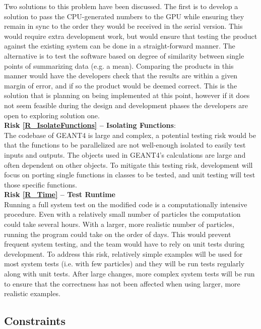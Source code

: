 \documentclass[12pt]{article}
\begin{document}
Two solutions to this problem have been discussed. The first is to develop a solution to pass the CPU-generated numbers to the GPU while ensuring they remain in sync to the order they would be received in the serial version. This would require extra development work, but would ensure that testing the product against the existing system can be done in a straight-forward manner. The alternative is to test the software based on degree of similarity between single points of summarizing data (e.g. a mean). Comparing the products in this manner would have the developers check that the results are within a given margin of error, and if so the product would be deemed correct. This is the solution that is planning on being implemented at this point, however if it does not seem feasible during the design and development phases the developers are open to exploring solution one.\\

\textbf{Risk \ref{R_IsolateFunctions} -- Isolating Functions}:\\
The codebase of GEANT4 is large and complex, a potential testing risk would be that the functions to be parallelized are not well-enough isolated to easily test inputs and outputs. The objects used in GEANT4's calculations are large and often dependent on other objects. To mitigate this testing risk, development will focus on porting single functions in classes to be tested, and unit testing will test those specific functions.\\

\textbf{Risk \ref{R_Time} -- Test Runtime}\\
Running a full system test on the modified code is a computationally intensive procedure. Even with a relatively small number of particles the computation could take several hours. With a larger, more realistic number of particles, running the program could take on the order of days. This would prevent frequent system testing, and the team would have to rely on unit tests during development. To address this risk, relatively simple examples will be used for most system tests (i.e. with few particles) and they will be run tests regularly along with unit tests. After large changes, more complex system tests will be run to ensure that the correctness has not been affected when using larger, more realistic examples.

\subsection{Constraints} %
\end{document}
